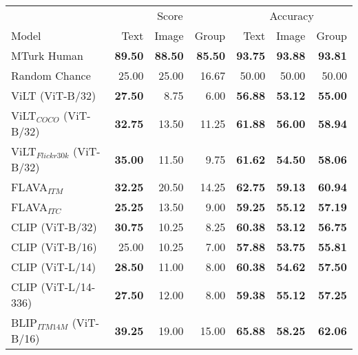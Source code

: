 \begin{table}[ht]
\centering
\begin{tabular}{l|rrr|rrr}
\toprule
 &
  \multicolumn{3}{c|}{{Score}} &
  \multicolumn{3}{c}{{Accuracy}} \\
 Model                               & Text           & Image          & Group          & Text       & Image      & Group      \\
\midrule
 MTurk Human                         & \textbf{89.50} & \textbf{88.50} & \textbf{85.50} & \textbf{93.75} & \textbf{93.88} & \textbf{93.81} \\
 Random Chance                       & 25.00          & 25.00          & 16.67          & 50.00          & 50.00          & 50.00          \\
 \midrule
  ViLT (ViT-B/32)                     & \textbf{27.50} & 8.75           & 6.00           & \textbf{56.88} & \textbf{53.12} & \textbf{55.00} \\
 ViLT$_{COCO}$ (ViT-B/32)            & \textbf{32.75} & 13.50          & 11.25          & \textbf{61.88} & \textbf{56.00} & \textbf{58.94} \\
 ViLT$_{Flickr30k}$ (ViT-B/32)       & \textbf{35.00} & 11.50          & 9.75           & \textbf{61.62} & \textbf{54.50} & \textbf{58.06} \\
 FLAVA$_{ITM}$                       & \textbf{32.25} & 20.50          & 14.25          & \textbf{62.75} & \textbf{59.13} & \textbf{60.94} \\
 FLAVA$_{ITC}$                       & \textbf{25.25} & 13.50          & 9.00           & \textbf{59.25} & \textbf{55.12} & \textbf{57.19} \\
 CLIP (ViT-B/32)                     & \textbf{30.75} & 10.25          & 8.25           & \textbf{60.38} & \textbf{53.12} & \textbf{56.75} \\
 CLIP (ViT-B/16)                     & 25.00          & 10.25          & 7.00           & \textbf{57.88} & \textbf{53.75} & \textbf{55.81} \\
 CLIP (ViT-L/14)                     & \textbf{28.50} & 11.00          & 8.00           & \textbf{60.38} & \textbf{54.62} & \textbf{57.50} \\
 CLIP (ViT-L/14-336)                 & \textbf{27.50} & 12.00          & 8.00           & \textbf{59.38} & \textbf{55.12} & \textbf{57.25} \\
 BLIP$_{ITM 14M}$ (ViT-B/16)         & \textbf{39.25} & 19.00          & 15.00          & \textbf{65.88} & \textbf{58.25} & \textbf{62.06} \\

\end{tabular}
\end{table}
